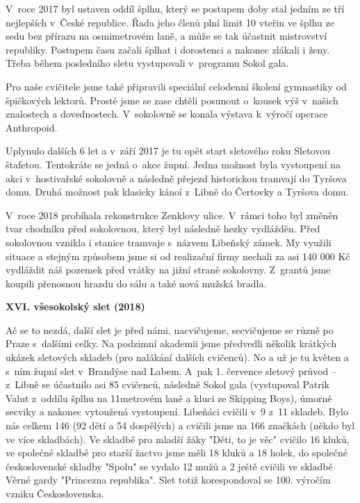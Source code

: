 \documentclass[a5paper, 12pt, twoside]{article}
\begin{document}
V~roce 2017 byl ustaven oddíl šplhu, který se postupem doby stal jedním
ze tří nejlepších v~České republice. Řada jeho členů plní limit 10
vteřin ve šplhu ze sedu bez přírazu na osmimetrovém laně, a může se tak
účastnit mistrovství republiky. Postupem času začali šplhat i dorostenci
a nakonec zlákali i ženy. Třeba během posledního sletu vystupovali
v~programu Sokol gala.

Pro naše cvičitele jsme také připravili speciální celodenní školení
gymnastiky od špičkových lektorů. Prostě jsme se zase chtěli posunout
o~kousek výš v~našich znalostech a dovednostech. V~sokolovně se konala
výstava k~výročí operace Anthropoid.

Uplynulo dalších 6 let a v~září 2017 je tu opět start sletového roku
Sletovou štafetou. Tentokráte se jedná o~akce župní. Jedna možnost byla
vystoupení na akci v~hostivařské sokolovně a následně přejezd
historickou tramvají do Tyršova domu. Druhá možnost pak klasicky kánoí
z~Libně do Čertovky a Tyršova domu.

V~roce 2018 probíhala rekonstrukce Zenklovy ulice. V~rámci toho byl
změněn tvar chodníku před sokolovnou, který byl následně hezky
vydlážděn. Před sokolovnou vznikla i stanice tramvaje s~názvem Libeňský
zámek. My využili situace a stejným způsobem jsme si od realizační firmy
nechali za asi 140 000 Kč vydláždit náš pozemek před vrátky na jižní
straně sokolovny. Z~grantů jsme koupili přenosnou hrazdu do sálu a také
nová mužská bradla.

\textbf{XVI. všesokolský slet (2018)}

Ač se to nezdá, další slet je před námi, nacvičujeme, secvičujeme se
různě po Praze s~dalšími celky. Na podzimní akademii jsme předvedli
několik krátkých ukázek sletových skladeb (pro nalákání dalších
cvičenců). No a už je tu květen a s~ním župní slet v~Brandýse nad Labem.
A~pak 1. července sletový průvod -- z~Libně se účastnilo asi 85
cvičenců, následně Sokol gala (vystupoval Patrik Valut z~oddílu šplhu na
11metrovém laně a kluci ze Skipping Boys), úmorné secviky a nakonec
vytoužená vystoupení. Libeňáci cvičili v~9 z~11 skladeb. Bylo nás celkem
146 (92 dětí a 54 dospělých) a cvičili jsme na 166 značkách (někdo byl
ve více skladbách). Ve skladbě pro mladší žáky "Děti, to je věc"
cvičilo 16 kluků, ve společné skladbě pro starší žactvo jsme měli 18
kluků a 18 holek, do společné československé skladby "Spolu" se vydalo
12 mužů a 2 ještě cvičili ve skladbě Věrné gardy "Princezna
republika". Slet totiž korespondoval se 100. výročím vzniku
Československa.
\end{document}
